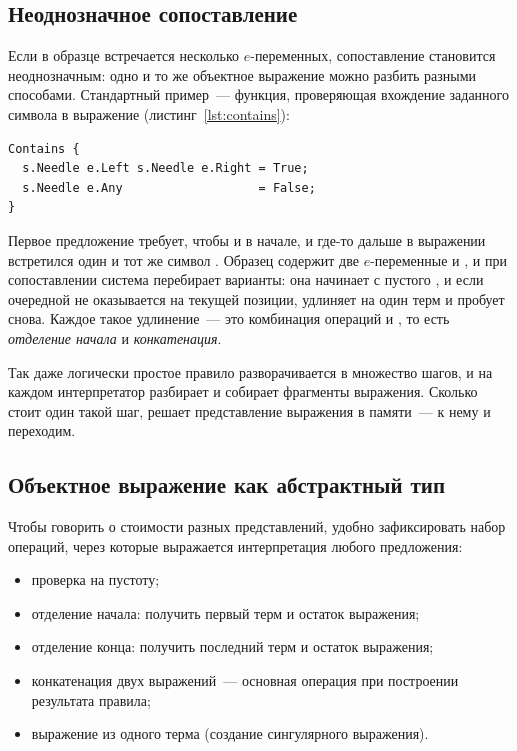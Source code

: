 \subsection{Неоднозначное сопоставление}
\label{sec:ambiguous-matching}

Если в образце встречается несколько \(e\)-переменных, сопоставление
становится неоднозначным: одно и то же объектное выражение можно
разбить разными способами. Стандартный пример~--- функция, проверяющая
вхождение заданного символа в выражение (листинг~\ref{lst:contains}):

\begin{lstlisting}[language=Refal,caption={Неоднозначное сопоставление при поиске символа},label={lst:contains}]
Contains {
  s.Needle e.Left s.Needle e.Right = True;
  s.Needle e.Any                   = False;
}
\end{lstlisting}

Первое предложение требует, чтобы и в начале, и где-то дальше в выражении
встретился один и тот же символ . Образец содержит две
\(e\)-переменные  и , и при сопоставлении
система перебирает варианты: она начинает с пустого , и
если очередной  не оказывается на текущей позиции,
удлиняет  на один терм и пробует снова. Каждое такое
удлинение~--- это комбинация операций  и , то
есть \emph{отделение начала} и \emph{конкатенация}.

Так даже логически простое правило разворачивается в множество шагов, и на каждом
интерпретатор разбирает и собирает фрагменты выражения. Сколько стоит один такой шаг,
решает представление выражения в памяти~--- к нему и переходим.

\subsection{Объектное выражение как абстрактный тип}
\label{sec:adt-ops}

Чтобы говорить о стоимости разных представлений, удобно зафиксировать набор
операций, через которые выражается интерпретация любого предложения:

\begin{itemize}
  \item проверка на пустоту;
  \item отделение начала: получить первый терм и остаток выражения;
  \item отделение конца: получить последний терм и остаток выражения;
  \item конкатенация двух выражений~--- основная операция при
        построении результата правила;
  \item выражение из одного терма (создание сингулярного выражения).
\end{itemize}

